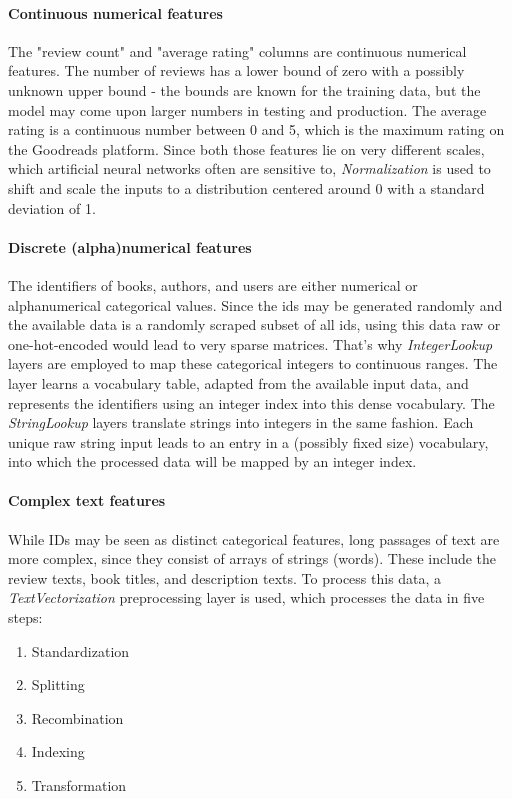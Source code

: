 \documentclass[10pt,final,journal,a4paper,oneside,twocolumn]{IEEEtran}
\begin{document}

\paragraph{Continuous numerical features}
The "review count" and "average rating" columns are continuous numerical features. The number of reviews has a lower bound of zero with a possibly unknown upper bound - the bounds are known for the training data, but the model may come upon larger numbers in testing and production. The average rating is a continuous number between 0 and 5, which is the maximum rating on the Goodreads platform. Since both those features lie on very different scales, which artificial neural networks often are sensitive to, \emph{Normalization} is used to shift and scale the inputs to a distribution centered around 0 with a standard deviation of 1.

\paragraph{Discrete (alpha)numerical features}
The identifiers of books, authors, and users are either numerical or alphanumerical categorical values. Since the ids may be generated randomly and the available data is a randomly scraped subset of all ids, using this data raw or one-hot-encoded would lead to very sparse matrices.
That's why \emph{IntegerLookup} layers are employed to map these categorical integers to continuous ranges. The layer learns a vocabulary table, adapted from the available input data, and represents the identifiers using an integer index into this dense vocabulary. 
The \emph{StringLookup} layers translate strings into integers in the same fashion. Each unique raw string input leads to an entry in a (possibly fixed size) vocabulary, into which the processed data will be mapped by an integer index.


\paragraph{Complex text features}
While IDs may be seen as distinct categorical features, long passages of text are more complex, since they consist of arrays of strings (words). These include the review texts, book titles, and description texts. To process this data, a \emph{TextVectorization} preprocessing layer is used, which processes the data in five steps:
\begin{enumerate}
    \item Standardization
    \item Splitting
    \item Recombination
    \item Indexing
    \item Transformation
\end{enumerate}
\end{document}

